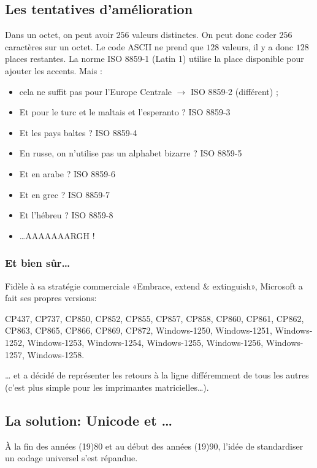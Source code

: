 \subsection{Les tentatives d'amélioration}


Dans un octet, on peut avoir $256$ valeurs distinctes. On peut donc coder $256$ caractères sur un octet. Le code ASCII ne prend que $128$ valeurs, il y a donc $128$ places restantes. 
La norme ISO 8859-1 (Latin 1) utilise la place disponible pour ajouter  les accents.
Mais : 
\begin{itemize}  
\item cela ne suffit pas pour l'Europe Centrale $\rightarrow$ ISO 8859-2 (différent) ;
\small{}
 \item Et pour le turc et le maltais et l'esperanto ? ISO 8859-3
\item Et les pays baltes ? ISO 8859-4
\item En russe, on n'utilise pas un alphabet bizarre ? ISO 8859-5
\scriptsize
\item Et en arabe ? ISO 8859-6
\item Et en grec ? ISO 8859-7
\item Et l'hébreu ? ISO 8859-8
\item \ldots{}AAAAAAARGH !
\end{itemize}

\subsubsection{Et bien sûr\ldots{}}

Fidèle à sa stratégie commerciale «Embrace, extend \& extinguish», 
Microsoft a fait ses propres versions:

 CP437, CP737, CP850, CP852, CP855, CP857, CP858, CP860, CP861, CP862,
 CP863, CP865, CP866, CP869, CP872, Windows-1250, Windows-1251,
    Windows-1252,
    Windows-1253,
    Windows-1254,
    Windows-1255,
    Windows-1256,
    Windows-1257,
    Windows-1258.

\ldots{} et a décidé de représenter les retours à la ligne différemment
de tous les autres (c'est plus simple pour les imprimantes
matricielles\ldots{}).

\subsection{La solution: Unicode et \ldots{}}

\`A la fin des années (19)80 et au début des années (19)90, l'idée de standardiser un codage universel s'est répandue.

